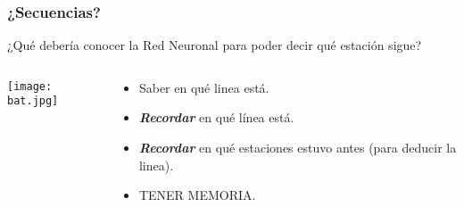 \begin{frame}
	\frametitle{¿Secuencias?}
	¿Qué debería conocer la Red Neuronal para poder decir qué estación sigue?
	
	\begin{columns}
		\begin{column}{0.5\textwidth}
			\begin{center}
				\texttt{[image: bat.jpg]}
			\end{center}
		\end{column}
		\begin{column}{0.5\textwidth}
			\begin{itemize}
				\item<2-> Saber en qué linea está.
				\item<3-> \textit{\textbf{Recordar}} en qué línea está.
				\item<4-> \textbf{\textit{Recordar}} en qué estaciones estuvo antes (para deducir la linea).
				\item<5-> TENER MEMORIA.
			\end{itemize}
		\end{column}
	\end{columns}
\end{frame}






